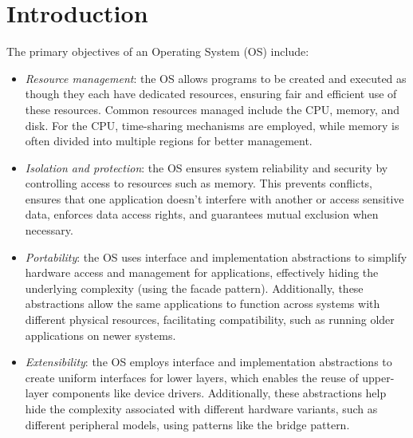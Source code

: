 \section{Introduction}

The primary objectives of an Operating System (OS) include:
\begin{itemize}
    \item \textit{Resource management}: the OS allows programs to be created and executed as though they each have dedicated resources, ensuring fair and efficient use of these resources. 
        Common resources managed include the CPU, memory, and disk. 
        For the CPU, time-sharing mechanisms are employed, while memory is often divided into multiple regions for better management.
    \item \textit{Isolation and protection}: the OS ensures system reliability and security by controlling access to resources such as memory. 
        This prevents conflicts, ensures that one application doesn't interfere with another or access sensitive data, enforces data access rights, and guarantees mutual exclusion when necessary.
    \item \textit{Portability}: the OS uses interface and implementation abstractions to simplify hardware access and management for applications, effectively hiding the underlying complexity (using the facade pattern). 
        Additionally, these abstractions allow the same applications to function across systems with different physical resources, facilitating compatibility, such as running older applications on newer systems.
    \item \textit{Extensibility}: the OS employs interface and implementation abstractions to create uniform interfaces for lower layers, which enables the reuse of upper-layer components like device drivers. 
        Additionally, these abstractions help hide the complexity associated with different hardware variants, such as different peripheral models, using patterns like the bridge pattern.
\end{itemize}